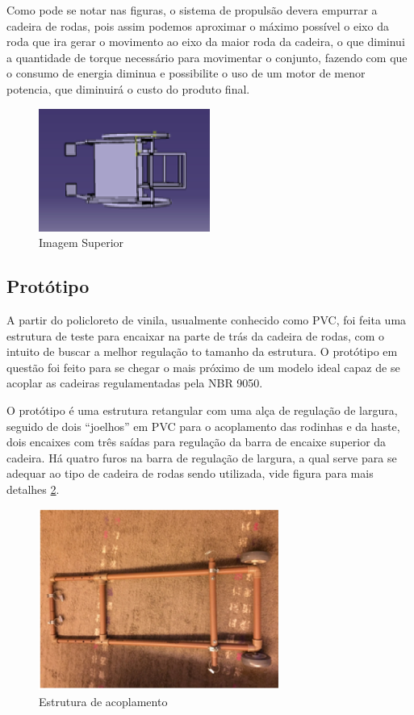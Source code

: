 Como pode se notar nas figuras, o sistema de propulsão devera empurrar a cadeira de rodas, pois assim podemos aproximar o máximo possível o eixo da roda que ira gerar o movimento ao eixo da maior roda da cadeira, o que diminui a quantidade de torque necessário para movimentar o conjunto, fazendo com que o consumo de energia diminua e possibilite o uso de um motor de menor potencia, que diminuirá o custo do produto final.

\begin{figure}[!htb]
\centering
\includegraphics[width=0.5\textwidth]{figuras/estrutura/vista_superior}
\caption{Imagem Superior}
\label{fig:superior}
\end{figure}

\subsection{Protótipo}

A partir do policloreto de vinila, usualmente conhecido como PVC, foi feita uma estrutura de teste para encaixar na parte de trás da cadeira de rodas, com o intuito de buscar a melhor regulação to tamanho da estrutura. O protótipo em questão foi feito para se chegar o mais próximo de um modelo ideal capaz de se acoplar as cadeiras regulamentadas pela NBR 9050.

O protótipo é uma estrutura retangular com uma alça de regulação de largura, seguido de dois “joelhos” em PVC para o acoplamento das rodinhas e da haste, dois encaixes com três saídas para regulação da barra de encaixe superior da cadeira. Há quatro furos na barra de regulação de largura, a qual serve para se adequar ao tipo de cadeira de rodas sendo utilizada, vide figura para mais detalhes \ref{fig:acoplamento}.

\begin{figure}[!htb]
\centering
\includegraphics[width=0.7\textwidth]{figuras/resultados/acoplamento}
\caption{Estrutura de acoplamento}
\label{fig:acoplamento}
\end{figure}

